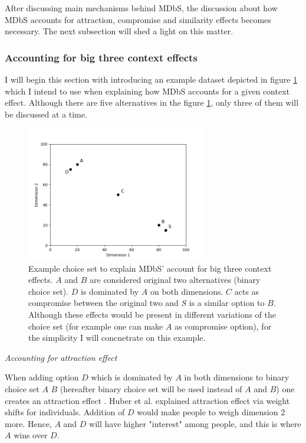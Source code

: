 \documentclass[a4paper,12pt]{article}
\newcommand{\citeyearonly}[1]{\citeyearpar{#1}}
\begin{document}
After discussing main mechanisms behind MDbS, the discussion about how MDbS accounts for attraction, compromise and similarity effects becomes necessary. The next subsection will shed a light on this matter.

\subsubsection{Accounting for big three context effects}

I will begin this section with introducing an example dataset depicted in figure \ref{fig:MDBsContextExample} which I intend to use when explaining how MDbS accounts for a given context effect. Although there are five alternatives in the figure \ref{fig:MDBsContextExample}, only three of them will be discussed at a time. 

\begin{figure}[h]
    \centering
    \includegraphics[width=0.7\textwidth]{staticFiles/contextEffectExampleScatterplot.png}
    \caption{Example choice set to explain MDbS' account for big three context effects. $A$ and $B$ are considered original two alternatives (binary choice set). $D$ is dominated by $A$ on both dimensions. $C$ acts as compromise between the original two and $S$ is a similar option to $B$. Although these effects would be present in different variations of the choice set (for example one can make $A$ as compromise option), for the simplicity I will concnetrate on this example.} %
    \label{fig:MDBsContextExample} %

\end{figure}

\textit{Accounting for attraction effect}

When adding option $D$ which is dominated by $A$ in both dimensions to binary choice set $A$ $B$ (hereafter binary choice set will be used instead of $A$ and $B$) one creates an attraction effect \citep{huberEtAl82, huberPuto83}. Huber et al. \citeyearonly{huberEtAl82} explained attraction effect via weight shifts for individuals. Addition of $D$ would make people to weigh dimension 2 more. Hence, $A$ and $D$ will have higher "interest" among people, and this is where $A$ wins over $D$.
\end{document}
